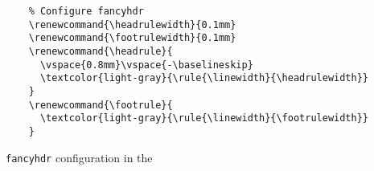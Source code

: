 \begin{listing}[H]
  \captionsetup{skip=\skiplistingcaptionlen}
  \begin{verbatim}
    % Configure fancyhdr
    \renewcommand{\headrulewidth}{0.1mm}
    \renewcommand{\footrulewidth}{0.1mm}
    \renewcommand{\headrule}{
      \vspace{0.8mm}\vspace{-\baselineskip}
      \textcolor{light-gray}{\rule{\linewidth}{\headrulewidth}}
    }
    \renewcommand{\footrule}{
      \textcolor{light-gray}{\rule{\linewidth}{\footrulewidth}}
    }
  \end{verbatim}
  \caption{\texttt{fancyhdr} configuration in the \uswdwmspkg{}}
  \label{example:lst:fancyhdr_config}
\end{listing}
